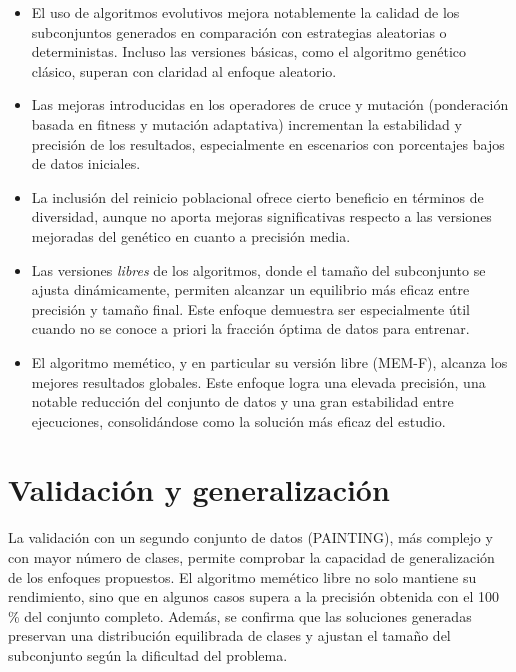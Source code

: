 \begin{itemize}
    \item El uso de algoritmos evolutivos mejora notablemente la calidad de los subconjuntos generados en comparación con estrategias aleatorias o deterministas.
          Incluso las versiones básicas, como el algoritmo genético clásico, superan con claridad al enfoque aleatorio.

    \item Las mejoras introducidas en los operadores de cruce y mutación (ponderación basada en fitness y mutación adaptativa)
          incrementan la estabilidad y precisión de los resultados, especialmente en escenarios con porcentajes bajos de datos iniciales.

    \item La inclusión del reinicio poblacional ofrece cierto beneficio en términos de diversidad,
          aunque no aporta mejoras significativas respecto a las versiones mejoradas del genético en cuanto a precisión media.

    \item Las versiones \textit{libres} de los algoritmos, donde el tamaño del subconjunto se ajusta dinámicamente,
          permiten alcanzar un equilibrio más eficaz entre precisión y tamaño final.
          Este enfoque demuestra ser especialmente útil cuando no se conoce a priori la fracción óptima de datos para entrenar.

    \item El algoritmo memético, y en particular su versión libre (MEM-F), alcanza los mejores resultados globales.
          Este enfoque logra una elevada precisión, una notable reducción del conjunto de datos y una gran estabilidad entre ejecuciones,
          consolidándose como la solución más eficaz del estudio.
\end{itemize}


\section{Validación y generalización}\label{sec:validacion-generalizacion}
La validación con un segundo conjunto de datos (PAINTING), más complejo y con mayor número de clases, permite comprobar la capacidad de generalización de los enfoques propuestos.
El algoritmo memético libre no solo mantiene su rendimiento, sino que en algunos casos supera a la precisión obtenida con el 100\,\% del conjunto completo.
Además, se confirma que las soluciones generadas preservan una distribución equilibrada de clases y ajustan el tamaño del subconjunto según la dificultad del problema.


